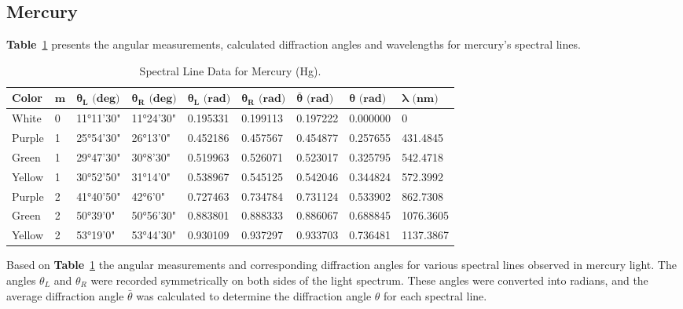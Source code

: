 \documentclass[a4paper,11pt]{article}
\begin{document}
\newpage
\subsection*{Mercury}
\label{sec:mercury}
\textbf{Table}~\ref{tab:spectral_data_hg} presents the angular measurements, calculated diffraction angles and wavelengths for mercury’s spectral lines.
\begin{table}[H]
  \centering
  \begin{tabular}{lllllllll}
  \toprule
  \textbf{Color} & \(\boldsymbol{m}\) & \(\boldsymbol{\theta_L \text{ (deg)}}\) & \(\boldsymbol{\theta_R \text{ (deg)}}\) & \(\boldsymbol{\theta_L \text{ (rad)}}\) & \(\boldsymbol{\theta_R \text{ (rad)}}\) & \(\boldsymbol{\bar \theta \text{ (rad)}}\) & \(\boldsymbol{\theta \text{ (rad)}}\) & \(\boldsymbol{\lambda \text{ (nm)}}\) \\
  \midrule
  White  & 0 & 11°11'30" & 11°24'30" & 0.195331 & 0.199113 & 0.197222 & 0.000000 & 0 \\
  Purple & 1 & 25°54'30" & 26°13'0"  & 0.452186 & 0.457567 & 0.454877 & 0.257655 & 431.4845 \\
  Green  & 1 & 29°47'30" & 30°8'30"  & 0.519963 & 0.526071 & 0.523017 & 0.325795 & 542.4718 \\
  Yellow & 1 & 30°52'50" & 31°14'0"  & 0.538967 & 0.545125 & 0.542046 & 0.344824 & 572.3992 \\
  Purple & 2 & 41°40'50" & 42°6'0"   & 0.727463 & 0.734784 & 0.731124 & 0.533902 & 862.7308 \\
  Green  & 2 & 50°39'0"  & 50°56'30" & 0.883801 & 0.888333 & 0.886067 & 0.688845 & 1076.3605 \\
  Yellow & 2 & 53°19'0"  & 53°44'30" & 0.930109 & 0.937297 & 0.933703 & 0.736481 & 1137.3867 \\
  \bottomrule
  \end{tabular}
  \caption{Spectral Line Data for Mercury (Hg).}
  \label{tab:spectral_data_hg}
\end{table}

\quad Based on \textbf{Table}~\ref{tab:spectral_data_hg} the angular measurements and corresponding diffraction angles for various spectral lines observed in mercury light. The angles $\theta_L$ and $\theta_R$ were recorded symmetrically on both sides of the light spectrum. These angles were converted into radians, and the average diffraction angle $\bar{\theta}$ was calculated to determine the diffraction angle $\theta$ for each spectral line.\\
\end{document}
